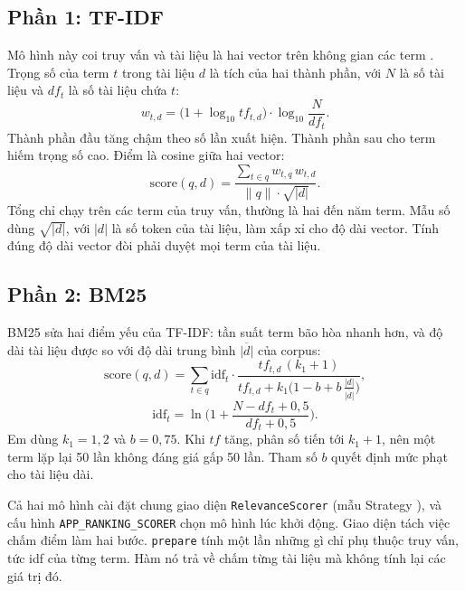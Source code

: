 \documentclass[9pt,twocolumn,a4paper]{extarticle}
\newcommand{\code}[1]{\texttt{#1}}
\begin{document}
\subsection{Phần 1: TF-IDF}
\label{sec:tfidf}
Mô hình này coi truy vấn và tài liệu là hai vector trên không gian các term \cite{salton1988}. Trọng số của term $t$ trong tài liệu $d$ là tích của hai thành phần, với $N$ là số tài liệu và $df_t$ là số tài liệu chứa $t$:
\begin{equation}
w_{t,d}=\big(1+\log_{10}tf_{t,d}\big)\cdot\log_{10}\frac{N}{df_t}.
\label{eq:tfidf}
\end{equation}
Thành phần đầu tăng chậm theo số lần xuất hiện. Thành phần sau cho term hiếm trọng số cao. Điểm là cosine giữa hai vector:
\begin{equation}
\text{score}(q,d)=\frac{\sum_{t\in q}w_{t,q}\,w_{t,d}}{\lVert q\rVert\cdot\sqrt{|d|}}.
\label{eq:cosine}
\end{equation}
Tổng chỉ chạy trên các term của truy vấn, thường là hai đến năm term. Mẫu số dùng $\sqrt{|d|}$, với $|d|$ là số token của tài liệu, làm xấp xỉ cho độ dài vector. Tính đúng độ dài vector đòi phải duyệt mọi term của tài liệu.

\subsection{Phần 2: BM25}
\label{sec:bm25}
BM25 \cite{robertson2009bm25} sửa hai điểm yếu của TF-IDF: tần suất term bão hòa nhanh hơn, và độ dài tài liệu được so với độ dài trung bình $\overline{|d|}$ của corpus:
\begin{equation}
\text{score}(q,d)=\sum_{t\in q}\text{idf}_t\cdot
\frac{tf_{t,d}\,(k_1+1)}{tf_{t,d}+k_1\Big(1-b+b\,\frac{|d|}{\overline{|d|}}\Big)},
\label{eq:bm25}
\end{equation}
\begin{equation}
\text{idf}_t=\ln\Big(1+\frac{N-df_t+0{,}5}{df_t+0{,}5}\Big).
\label{eq:bm25idf}
\end{equation}
Em dùng $k_1=1{,}2$ và $b=0{,}75$. Khi $tf$ tăng, phân số tiến tới $k_1+1$, nên một term lặp lại 50 lần không đáng giá gấp 50 lần. Tham số $b$ quyết định mức phạt cho tài liệu dài.

Cả hai mô hình cài đặt chung giao diện \code{RelevanceScorer} (mẫu Strategy \cite{gamma1994design}), và cấu hình \code{APP\_RANKING\_SCORER} chọn mô hình lúc khởi động. Giao diện tách việc chấm điểm làm hai bước. \code{prepare} tính một lần những gì chỉ phụ thuộc truy vấn, tức idf của từng term. Hàm nó trả về chấm từng tài liệu mà không tính lại các giá trị đó.
\end{document}
